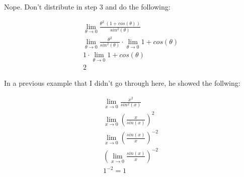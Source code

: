 \documentclass{article}
\begin{document}
Nope. Don't distribute in step 3 and do the following:

\begin{align*}
    \lim_{\theta\to 0} \frac{\theta^2~(1 + cos(\theta))}{sin^2(\theta)}\\
    \lim_{\theta\to 0} \frac{\theta^2}{sin^2(\theta)} \cdot \lim_{\theta\to 0} 1 +
    cos(\theta) \\
    1 \cdot \lim_{\theta\to 0} 1 + cos(\theta)\\
    2
\end{align*}

In a previous example that I didn't go through here, he showed the follwing:

\begin{align*}
    \lim_{x\to 0} \frac{x^2}{sin^2(x)}\\
    \lim_{x\to 0} \left ( \frac{x}{sin(x)}\right ) ^2\\
    \lim_{x\to 0} \left ( \frac{sin(x)}{x}\right ) ^{-2}\\
    \left ( \lim_{x\to 0} \frac{sin(x)}{x} \right )^{-2}\\
    1^{-2} = 1
\end{align*}
\end{document}
